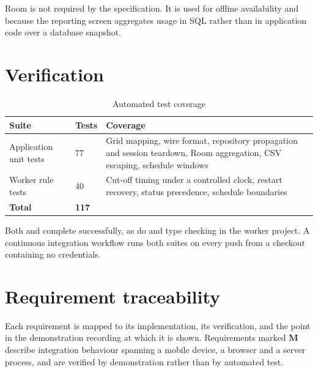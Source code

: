 \documentclass[11pt,a4paper]{article}
\begin{document}
Room is not required by the specification. It is used for offline availability
and because the reporting screen aggregates usage in SQL rather than in
application code over a database snapshot.

\section{Verification}
\label{app:verification}

\begin{table}[h]
\centering
\caption{Automated test coverage}
\begin{tabular}{@{}L{4.2cm}L{1.8cm}L{8.0cm}@{}}
\toprule
\textbf{Suite} & \textbf{Tests} & \textbf{Coverage} \\
\midrule
Application unit tests & 77 & Grid mapping, wire format, repository propagation and session teardown, Room aggregation, CSV escaping, schedule windows \\
Worker rule tests      & 40 & Cut-off timing under a controlled clock, restart recovery, status precedence, schedule boundaries \\
\midrule
\textbf{Total}         & \textbf{117} & \\
\bottomrule
\end{tabular}
\end{table}

Both  and  complete
successfully, as do  and type checking in the worker project. A
continuous integration workflow runs both suites on every push from a checkout
containing no credentials.

\section{Requirement traceability}
\label{app:traceability}

Each requirement is mapped to its implementation, its verification, and the
point in the demonstration recording at which it is shown. Requirements marked
\textbf{M} describe integration behaviour spanning a mobile device, a browser and
a server process, and are verified by demonstration rather than by automated
test.
\end{document}
